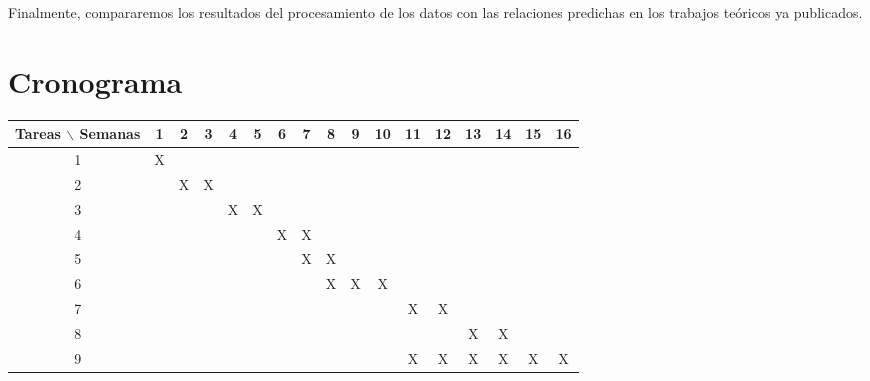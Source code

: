 \documentclass[12pt]{article}
\begin{document}
Finalmente, compararemos los resultados del procesamiento de los datos
con las relaciones predichas en los trabajos te\'oricos ya publicados.







\section{Cronograma}

\begin{table}[htb]
	\begin{tabular}{|c|cccccccccccccccc| }
	\hline
	Tareas $\backslash$ Semanas & 1 & 2 & 3 & 4 & 5 & 6 & 7 & 8 & 9 & 10 & 11 & 12 & 13 & 14 & 15 & 16  \\
	\hline
	1 & X &   &   &   &   &   &   &   &   &   &   &   &   &   &   &   \\
	2 &   & X & X &   &   &   &   &   &   &   &   &   &   &   &   &   \\
	3 &   &   &   & X & X &   &   &   &   &   &   &   &   &   &   &   \\
	4 &   &   &   &   &   & X & X &   &   &   &   &   &   &   &   &   \\
	5 &   &   &   &   &   &   & X & X &   &   &   &   &   &   &   &   \\
	6 &   &   &   &   &   &   &   & X & X & X &   &   &   &   &   &   \\
	7 &   &   &   &   &   &   &   &   &   &   & X & X &   &   &   &   \\
	8 &   &   &   &   &   &   &   &   &   &   &   &   & X & X &   &   \\
	9 &   &   &   &   &   &   &   &   &   &   & X & X & X & X & X & X \\
	\hline
	\end{tabular}
\end{table}
\vspace{1mm}
\end{document}
